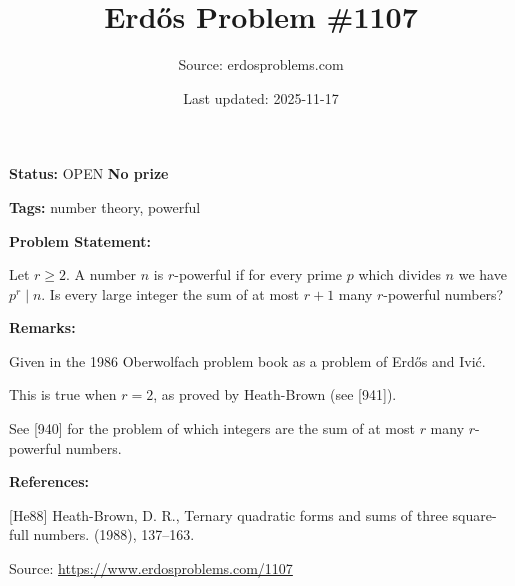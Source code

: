 \documentclass{article}
\title{Erd\H{o}s Problem \#1107}
\date{Last updated: 2025-11-17}
\author{Source: erdosproblems.com}
\begin{document}
\maketitle

\noindent\textbf{Status:} OPEN \quad \textbf{No prize}

\noindent\textbf{Tags:} number theory, powerful

\medskip
\noindent\textbf{Problem Statement:}

Let $r\geq 2$. A number $n$ is $r$-powerful if for every prime $p$ which divides $n$ we have $p^r\mid n$. Is every large integer the sum of at most $r+1$ many $r$-powerful numbers?

\bigskip
\noindent\textbf{Remarks:}

Given in the 1986 Oberwolfach problem book as a problem of Erd\H{o}s and Ivi\'{c}.

This is true when $r=2$, as proved by Heath-Brown \cite{He88} (see [941]). 

See [940] for the problem of which integers are the sum of at most $r$ many $r$-powerful numbers.

\bigskip
\noindent\textbf{References:}

[He88] Heath-Brown, D. R., Ternary quadratic forms and sums of three square-full numbers. (1988), 137--163.

\bigskip
\noindent\small{Source: \url{https://www.erdosproblems.com/1107}}
\end{document}
